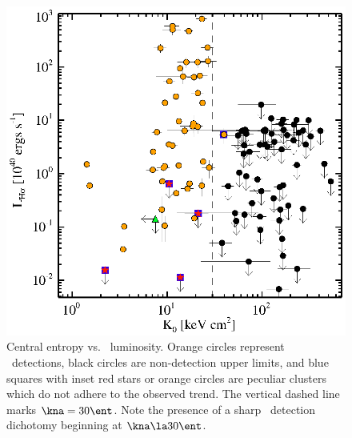 \documentclass[12pt]{cv}
\begin{document}
\begin{figure}[t]
\begin{minipage}[t]{0.5\linewidth}
        \includegraphics*[width=\columnwidth, trim=28mm 7mm 40mm 17mm, clip]{ha.eps}
        \caption{\footnotesize Central entropy
          vs. \halpha\ luminosity. Orange circles represent
          \halpha\ detections, black circles are non-detection upper
          limits, and blue squares with inset red stars or orange
          circles are peculiar clusters which do not adhere to the
          observed trend. The vertical dashed line marks $\kna = 30
          \ent$. Note the presence of a sharp \halpha\ detection
          dichotomy beginning at $\kna \la 30 \ent$.}
        \label{fig:ha}
    \end{minipage}
\end{figure}
 
\end{document}
